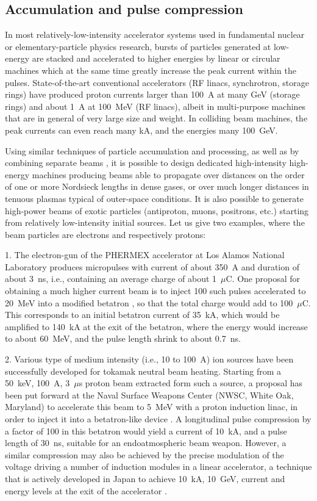\documentclass [12pt,a4paper,     ]{report} %
\begin{document}
\subsection{Accumulation and pulse compression}

In most relatively-low-intensity accelerator systems used in fundamental nuclear or elementary-particle physics research, bursts of particles generated at low-energy are stacked and accelerated to higher energies by linear or circular machines which at the same time greatly increase the peak current within the pulses.  State-of-the-art conventional accelerators (RF linacs, synchrotron, storage rings) have produced proton currents larger than 100~A at many GeV (storage rings) and about 1~A at 100~MeV (RF linacs), albeit in multi-purpose machines that are in general of very large size and weight.  In colliding beam machines, the peak currents can even reach many kA, and the energies many 100~GeV.

   Using similar techniques of particle accumulation and processing, as well as by combining separate beams \cite{YU---1996-}, it is possible to design dedicated high-intensity high-energy machines producing beams able to propagate over distances on the order of one or more Nordsieck lengths in dense gases, or over much longer distances in tenuous plasmas typical of outer-space conditions.  It is also possible to generate high-power beams of exotic particles (antiproton, muons, positrons, etc.) starting from relatively low-intensity initial sources.  Let us give two examples, where the beam particles are electrons and respectively protons:

  1. The electron-gun of the PHERMEX accelerator at Los Alamos National Laboratory produces micropulses with current of about 350~A and duration of about 3~ns, i.e., containing an average charge of about 1~$\mu$C.  One proposal for obtaining a much higher current beam is to inject 100 such pulses accelerated to 20~MeV into a modified betatron \cite{MOIR-1985B,TAGGA1984-}, so that the total charge would add to 100~$\mu$C.  This corresponds to an initial betatron current of 35~kA, which would be amplified to 140~kA at the exit of the betatron, where the energy would increase to about 60~MeV, and the pulse length shrink to about 0.7~ns.

   2. Various type of medium intensity (i.e., 10 to 100~A) ion sources have been successfully developed for tokamak neutral beam heating.  Starting from a 50~keV, 100~A, 3~$\mu$s proton beam extracted form such a source, a proposal has been put forward at the Naval Surface Weapons Center (NWSC, White Oak, Maryland) to accelerate this beam to 5~MeV with a proton induction linac, in order to inject it into a betatron-like device \cite{NAMKU1985-}.  A longitudinal pulse compression by a factor of 100 in this betatron would yield a current of 10~kA, and a pulse length of 30~ns, suitable for an endoatmospheric beam weapon.  However, a similar compression may also be achieved by the precise modulation of the voltage driving a number of induction modules in a linear accelerator, a technique that is actively developed in Japan to achieve 10~kA, 10~GeV, current and energy levels at the exit of the accelerator \cite{HORIO1998-}.
\end{document}
